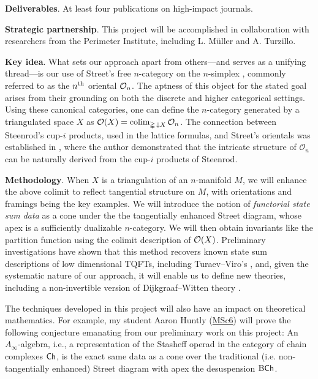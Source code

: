 \medskip\noindent\textbf{Deliverables}.
At least four publications on high-impact journals.

\medskip\noindent\textbf{Strategic partnership}.
This project will be accomplished in collaboration with researchers from the Perimeter Institute, including L. M\"uller and A. Turzillo.

\medskip\noindent\textbf{Key idea}.
What sets our approach apart from others—and serves as a unifying thread—is our use of Street's free $n$-category on the $n$-simplex \cite{street1987orientals}, commonly referred to as the $n^{\mathrm{th}}$ oriental $\mathcal{O}_n$.
The aptness of this object for the stated goal arises from their grounding on both the discrete and higher categorical settings.
Using these canonical categories, one can define the $n$-category generated by a triangulated space $X$ as $\mathcal{O}(X) = \operatorname*{colim}_{\mathbb{\Delta}\, \downarrow X} \mathcal{O}_n$.
The connection between Steenrod's cup-$i$ products, used in the lattice formulas, and Street's orientals was established in \cite{medina2020globular}, where the author demonstrated that the intricate structure of $\mathcal{O}_n$ can be naturally derived from the cup-$i$ products of Steenrod.

\medskip\noindent\textbf{Methodology}.
When $X$ is a triangulation of an $n$-manifold $M$, we will enhance the above colimit to reflect tangential structure on $M$, with orientations and framings being the key examples.
We will introduce the notion of \textit{functorial state sum data} as a cone under the the tangentially enhanced Street diagram, whose apex is a sufficiently dualizable $n$-category.
We will then obtain invariants like the partition function using the colimit description of $\mathcal{O}(X)$.
Preliminary investigations have shown that this method recovers known state sum descriptions of low dimensional TQFTs, including Turaev--Viro's \cite{turaev1992invariants}, and, given the systematic nature of our approach, it will enable us to define new theories, including a non-invertible version of Dijkgraaf--Witten theory \cite{dijkgraaf1990topological}.

\quad The techniques developed in this project will also have an impact on theoretical mathematics.
For example, my student Aaron Huntly (\underline{MSc6}) will prove the following conjecture emanating from our preliminary work on this project: An $A_\infty$-algebra, i.e., a representation of the Stasheff operad \cite{loday2004stasheff} in the category of chain complexes $\mathsf{Ch}$, is the exact same data as a cone over the traditional (i.e. non-tangentially enhanced) Street diagram with apex the desuspension $\mathrm{B}\mathsf{Ch}$.

